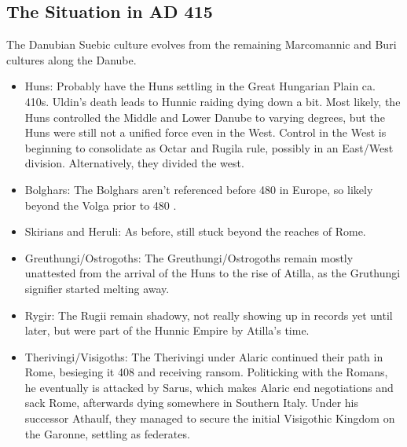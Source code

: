 \documentclass{article}
\begin{document}
	\newpage
	\subsection{The Situation in AD 415}
	\label{sec:timeline:subsec:415}
	The Danubian Suebic culture evolves from the remaining Marcomannic and Buri cultures along the Danube.
	
	\begin{itemize}
		\item Huns:\newline
		Probably have the Huns settling in the Great Hungarian Plain ca. 410s.
		Uldin's death leads to Hunnic raiding dying down a bit.
		Most likely, the Huns controlled the Middle and Lower Danube to varying degrees, but the Huns were still not a unified force even in the West.
		Control in the West is beginning to consolidate as Octar and Rugila rule, possibly in an East/West division.
		Alternatively, they divided the west.
		
		\item Bolghars:\newline
		The Bolghars aren't referenced before 480 in Europe, so likely beyond the Volga prior to 480 \cite{KimHuns}.
		
		\item Skirians and Heruli:\newline
		As before, still stuck beyond the reaches of Rome.
		
		\item Greuthungi/Ostrogoths:\newline
		The Greuthungi/Ostrogoths remain mostly unattested from the arrival of the Huns to the rise of Atilla, as the Gruthungi signifier started melting away.
		
		\item Rygir:\newline
		The Rugii remain shadowy, not really showing up in records yet until later, but were part of the Hunnic Empire by Atilla's time.
		
		\item Therivingi/Visigoths:\newline
		The Therivingi under Alaric continued their path in Rome, besieging it 408 and receiving ransom.
		Politicking with the Romans, he eventually is attacked by Sarus, which makes Alaric end negotiations and sack Rome, afterwards dying somewhere in Southern Italy.
		Under his successor Athaulf, they managed to secure the initial Visigothic Kingdom on the Garonne, settling as federates.
		

\end{itemize}
\end{document}
